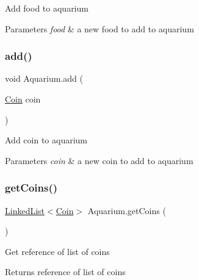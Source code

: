 Add food to aquarium 
\begin{DoxyParams}{Parameters}
{\em food} & a new food to add to aquarium \\
\hline
\end{DoxyParams}
\mbox{\label{class_aquarium_a99b7bb8813dc2e0251e675b9e75906d7}} 
\subsubsection{\texorpdfstring{add()}{add()}\hspace{0.1cm}{\footnotesize\ttfamily [5/5]}}
{\footnotesize\ttfamily void Aquarium.\+add (\begin{DoxyParamCaption}\item[{\mbox{\hyperlink{class_coin}{Coin}}}]{coin }\end{DoxyParamCaption})\hspace{0.3cm}{\ttfamily [inline]}}

Add coin to aquarium 
\begin{DoxyParams}{Parameters}
{\em coin} & a new coin to add to aquarium \\
\hline
\end{DoxyParams}
\mbox{\label{class_aquarium_a93d60eb37e0306107617dc4d97adcacc}} 
\subsubsection{\texorpdfstring{get\+Coins()}{getCoins()}}
{\footnotesize\ttfamily \mbox{\hyperlink{class_linked_list}{Linked\+List}}$<$\mbox{\hyperlink{class_coin}{Coin}}$>$ Aquarium.\+get\+Coins (\begin{DoxyParamCaption}{ }\end{DoxyParamCaption})\hspace{0.3cm}{\ttfamily [inline]}}

Get reference of list of coins \begin{DoxyReturn}{Returns}
reference of list of coins 
\end{DoxyReturn}
\mbox{\label{class_aquarium_a27dcfed721c8fa4deee9c168e9478b2c}} 
